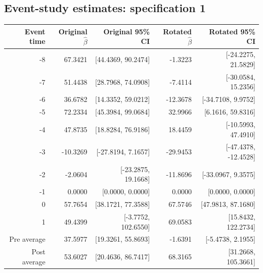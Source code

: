 \documentclass[10pt]{article}
\begin{document}
\subsection*{Event-study estimates: specification 1}
\begin{center}\scriptsize
\begin{tabular}{r rr rr}
\toprule
Event time & Original $\hat\beta$ & Original 95\% CI & Rotated $\hat\beta$ & Rotated 95\% CI \\
\midrule
-8 & 67.3421 & [44.4369, 90.2474] & -1.3223 & [-24.2275, 21.5829] \\
-7 & 51.4438 & [28.7968, 74.0908] & -7.4114 & [-30.0584, 15.2356] \\
-6 & 36.6782 & [14.3352, 59.0212] & -12.3678 & [-34.7108, 9.9752] \\
-5 & 72.2334 & [45.3984, 99.0684] & 32.9966 & [6.1616, 59.8316] \\
-4 & 47.8735 & [18.8284, 76.9186] & 18.4459 & [-10.5993, 47.4910] \\
-3 & -10.3269 & [-27.8194, 7.1657] & -29.9453 & [-47.4378, -12.4528] \\
-2 & -2.0604 & [-23.2875, 19.1668] & -11.8696 & [-33.0967, 9.3575] \\
-1 & 0.0000 & [0.0000, 0.0000] & 0.0000 & [0.0000, 0.0000] \\
0 & 57.7654 & [38.1721, 77.3588] & 67.5746 & [47.9813, 87.1680] \\
1 & 49.4399 & [-3.7752, 102.6550] & 69.0583 & [15.8432, 122.2734] \\
\midrule
Pre average & 37.5977 & [19.3261, 55.8693] & -1.6391 & [-5.4738, 2.1955] \\
Post average & 53.6027 & [20.4636, 86.7417] & 68.3165 & [31.2668, 105.3661] \\
\bottomrule
\end{tabular}
\end{center}
\clearpage
\end{document}

